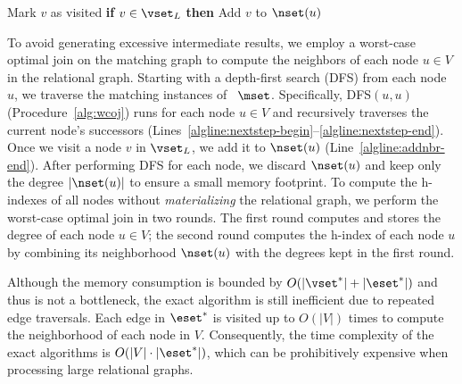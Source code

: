 \begin{procedure}[t]
\caption{DFS($u,v$)}
\label{alg:wcoj}
    \LinesNumbered
    Mark $v$ as visited\;
    \textbf{if} $v \in \vset_{L}$ \textbf{then} Add $v$ to $\nset(u)$\;\label{algline:addnbr-end}
\end{procedure}

To avoid generating excessive intermediate results, we employ a worst-case optimal join on the matching graph to compute the neighbors of each node $u \in V$ in the relational graph.
Starting with a depth-first search (DFS) from each node $u$, we traverse the matching instances of~ $\mset$.
Specifically, DFS$(u, u)$ (Procedure~\ref{alg:wcoj}) runs for each node $u \in V$ and recursively traverses the current node's successors (Lines~\ref{algline:nextstep-begin}--\ref{algline:nextstep-end}).
Once we visit a node $v$ in $\vset_L$, we add it to $\nset(u)$ (Line~\ref{algline:addnbr-end}).
After performing DFS for each node, we discard $\nset(u)$ and keep only the degree $|\nset(u)|$ to ensure a small memory footprint.
To compute the h-indexes of all nodes without \emph{materializing} the relational graph, we perform the worst-case optimal join in two rounds.
The first round computes and stores the degree of each node $u \in V$; the second round computes the h-index of each node $u$ by combining its neighborhood $\nset(u)$ with the degrees kept in the first round.

Although the memory consumption is bounded by $O(|\vset^*|+|\eset^*|)$ and thus is not a bottleneck, the exact algorithm is still inefficient due to repeated edge traversals.
Each edge in $\eset^*$ is visited up to $O(|V|)$ times to compute the neighborhood of each node in $V$.
Consequently, the time complexity of the exact algorithms is $O(|V| \cdot |\eset^*|)$, which can be prohibitively expensive when processing large relational graphs.




